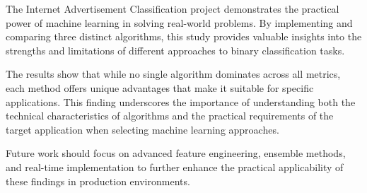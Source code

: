 The Internet Advertisement Classification project demonstrates the practical power of machine learning in solving real-world problems. By implementing and comparing three distinct algorithms, this study provides valuable insights into the strengths and limitations of different approaches to binary classification tasks.

The results show that while no single algorithm dominates across all metrics, each method offers unique advantages that make it suitable for specific applications. This finding underscores the importance of understanding both the technical characteristics of algorithms and the practical requirements of the target application when selecting machine learning approaches.

Future work should focus on advanced feature engineering, ensemble methods, and real-time implementation to further enhance the practical applicability of these findings in production environments.